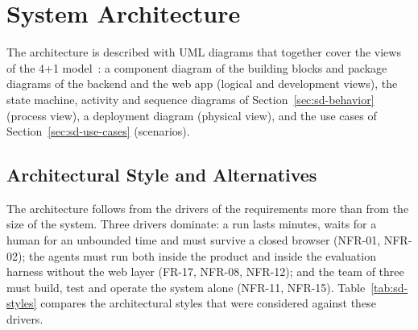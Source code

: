 \section{System Architecture}
\label{sec:sd-architecture}

The architecture is described with UML diagrams that together cover the views of the 4+1 model~\cite{kruchten1995}: a component diagram of the building blocks and package diagrams of the backend and the web app (logical and development views), the state machine, activity and sequence diagrams of Section~\ref{sec:sd-behavior} (process view), a deployment diagram (physical view), and the use cases of Section~\ref{sec:sd-use-cases} (scenarios).

\subsection{Architectural Style and Alternatives}
\label{sec:sd-style}

The architecture follows from the drivers of the requirements more than from the size of the system. Three drivers dominate: a run lasts minutes, waits for a human for an unbounded time and must survive a closed browser (NFR-01, NFR-02); the agents must run both inside the product and inside the evaluation harness without the web layer (FR-17, NFR-08, NFR-12); and the team of three must build, test and operate the system alone (NFR-11, NFR-15). Table~\ref{tab:sd-styles} compares the architectural styles that were considered against these drivers.

